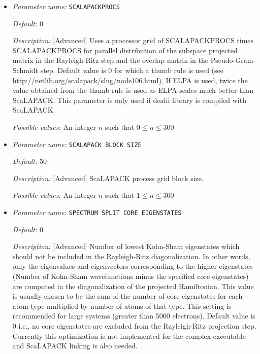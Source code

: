 \begin{itemize}
{\it Possible values:} Any one of GS, LW, PGS, Auto
\item {\it Parameter name:} {\tt SCALAPACKPROCS}
\label{parameters:SCF parameters/Eigen_2dsolver parameters/SCALAPACKPROCS}
\label{parameters:SCF_20parameters/Eigen_2dsolver_20parameters/SCALAPACKPROCS}




{\it Default:} 0


{\it Description:} [Advanced] Uses a processor grid of SCALAPACKPROCS times SCALAPACKPROCS for parallel distribution of the subspace projected matrix in the Rayleigh-Ritz step and the overlap matrix in the Pseudo-Gram-Schmidt step. Default value is 0 for which a thumb rule is used (see http://netlib.org/scalapack/slug/node106.html). If ELPA is used, twice the value obtained from the thumb rule is used as ELPA scales much better than ScaLAPACK. This parameter is only used if dealii library is compiled with ScaLAPACK.


{\it Possible values:} An integer $n$ such that $0\leq n \leq 300$
\item {\it Parameter name:} {\tt SCALAPACK BLOCK SIZE}
\label{parameters:SCF parameters/Eigen_2dsolver parameters/SCALAPACK BLOCK SIZE}
\label{parameters:SCF_20parameters/Eigen_2dsolver_20parameters/SCALAPACK_20BLOCK_20SIZE}




{\it Default:} 50


{\it Description:} [Advanced] ScaLAPACK process grid block size.


{\it Possible values:} An integer $n$ such that $1\leq n \leq 300$
\item {\it Parameter name:} {\tt SPECTRUM SPLIT CORE EIGENSTATES}
\label{parameters:SCF parameters/Eigen_2dsolver parameters/SPECTRUM SPLIT CORE EIGENSTATES}
\label{parameters:SCF_20parameters/Eigen_2dsolver_20parameters/SPECTRUM_20SPLIT_20CORE_20EIGENSTATES}




{\it Default:} 0


{\it Description:} [Advanced] Number of lowest Kohn-Sham eigenstates which should not be included in the Rayleigh-Ritz diagonalization.  In other words, only the eigenvalues and eigenvectors corresponding to the higher eigenstates (Number of Kohn-Sham wavefunctions minus the specified core eigenstates) are computed in the diagonalization of the projected Hamiltonian. This value is usually chosen to be the sum of the number of core eigenstates for each atom type multiplied by number of atoms of that type. This setting is recommended for large systems (greater than 5000 electrons). Default value is 0 i.e., no core eigenstates are excluded from the Rayleigh-Ritz projection step. Currently this optimization is not implemented for the complex executable and ScaLAPACK linking is also needed.



\end{itemize}
